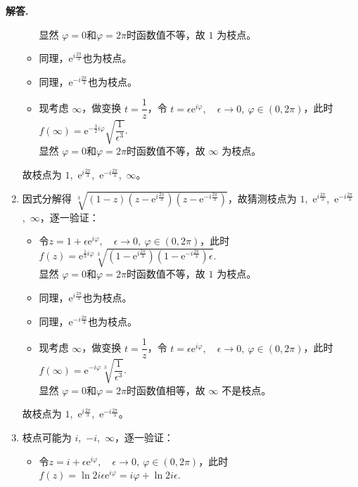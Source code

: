 \documentclass[11pt]{ctexart}
\newenvironment{solution}{\par\noindent\textbf{解答. }}{\par}
\begin{document}
\begin{solution}
\begin{enumerate}[(1)]
\begin{itemize}
            显然 $\varphi = 0$和$\varphi = 2\pi$时函数值不等，故 $1$ 为枝点。
            \item 同理，$\text{e}^{i\frac{2\pi}{3}}$也为枝点。
            \item 同理，$\text{e}^{-i\frac{2\pi}{3}}$也为枝点。
            \item 现考虑 $\infty$，做变换 $t = \dfrac{1}{z}$，令 $t = \epsilon\text{e}^{i\varphi},\quad \epsilon\to 0,\ \varphi\in(0,2\pi)$，此时 $f(\infty) = \text{e}^{-\frac{3}{2}i\varphi}\sqrt{\dfrac{1}{\epsilon^3}}$. \\
            显然 $\varphi = 0$和$\varphi = 2\pi$时函数值不等，故 $\infty$ 为枝点。
        \end{itemize}
        故枝点为  $1$,\ $\text{e}^{i\frac{2\pi}{3}}$,\ $\text{e}^{-i\frac{2\pi}{3}}$,\ $\infty$。
        \item 因式分解得 $\sqrt[3]{(1-z)(z-\text{e}^{i\frac{2\pi}{3}})(z-\text{e}^{-i\frac{2\pi}{3}})}$，故猜测枝点为 $1$,\ $\text{e}^{i\frac{2\pi}{3}}$,\ $\text{e}^{-i\frac{2\pi}{3}}$,\ $\infty$，逐一验证：
        \begin{itemize}
            \item 令$z = 1 + \epsilon\text{e}^{i\varphi},\quad \epsilon\to 0,\ \varphi\in(0,2\pi)$，此时 $f(z) = \text{e}^{\frac{1}{3}i\varphi}\sqrt[3]{(1-\text{e}^{i\frac{2\pi}{3}})(1-\text{e}^{-i\frac{2\pi}{3}})\epsilon}$. \\
            显然 $\varphi = 0$和$\varphi = 2\pi$时函数值不等，故 $1$ 为枝点。
            \item 同理，$\text{e}^{i\frac{2\pi}{3}}$也为枝点。
            \item 同理，$\text{e}^{-i\frac{2\pi}{3}}$也为枝点。
            \item 现考虑 $\infty$，做变换 $t = \dfrac{1}{z}$，令 $t = \epsilon\text{e}^{i\varphi},\quad \epsilon\to 0,\ \varphi\in(0,2\pi)$，此时 $f(\infty) = \text{e}^{-i\varphi}\sqrt[3]{\dfrac{1}{\epsilon^3}}$. \\
            显然 $\varphi = 0$和$\varphi = 2\pi$时函数值相等，故 $\infty$ 不是枝点。
        \end{itemize}
        故枝点为  $1$,\ $\text{e}^{i\frac{2\pi}{3}}$,\ $\text{e}^{-i\frac{2\pi}{3}}$。
        \item 枝点可能为 $i$,\ $-i$,\ $\infty$，逐一验证：
    \begin{itemize}
        \item 令$z = i + \epsilon\text{e}^{i\varphi},\quad \epsilon\to 0,\ \varphi\in(0,2\pi)$，此时 $f(z) = \ln{2i\epsilon\text{e}^{i\varphi}} = i\varphi + \ln{2i\epsilon}$. \\

\end{itemize}
\end{enumerate}
\end{solution}
\end{document}

